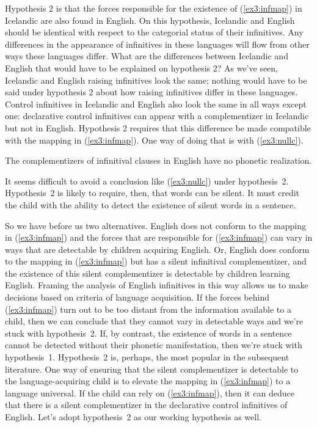 Hypothesis 2 is that the forces responsible for the existence of (\ref{ex3:infmap}) in Icelandic are also found in English. On this hypothesis, Icelandic and English should be identical with respect to the categorial status of their infinitives. Any differences in the appearance of infinitives in these languages will flow from other ways these languages differ. What are the differences between Icelandic and English that would have to be explained on hypothesis 2? As we've seen, Icelandic and English raising infinitives look the same; nothing would have to be said under hypothesis 2 about how raising infinitives differ in these languages. Control infinitives in Icelandic and English also look the same in all ways except one: declarative control infinitives can appear with a complementizer in Icelandic but not in English. Hypothesis 2 requires that this difference be made compatible with the mapping in (\ref{ex3:infmap}). One way of doing that is with (\ref{ex3:nullc}).
\begin{exe}
\ex \label{ex3:nullc} The complementizers of infinitival clauses in English have no phonetic realization.
\end{exe}
It seems difficult to avoid a conclusion like (\ref{ex3:nullc}) under hypothesis~2. Hypothesis~2 is likely to require, then, that words can be silent. It must credit the child with the ability to detect the existence of silent words in a sentence.

So we have before us two alternatives. English does not conform to the mapping in (\ref{ex3:infmap}) and the forces that are responsible for (\ref{ex3:infmap}) can vary in ways that are detectable by children acquiring English. Or, English does conform to the mapping in (\ref{ex3:infmap}) but has a silent infinitival complementizer, and the existence of this silent complementizer is detectable by children learning English. Framing the analysis of English infinitives in this way allows us to make decisions based on criteria of language acquisition. If the forces behind (\ref{ex3:infmap}) turn out to be too distant from the information available to a child, then we can conclude that they cannot vary in detectable ways and we're stuck with hypothesis~2. If, by contrast, the existence of words in a sentence cannot be detected without their phonetic manifestation, then we're stuck with hypothesis~1. Hypothesis~2 is, perhaps, the most popular in the subsequent literature. One way of ensuring that the silent complementizer is detectable to the language-acquiring child is to elevate the mapping in (\ref{ex3:infmap}) to a language universal. If the child can rely on (\ref{ex3:infmap}), then it can deduce that there is a silent complementizer in the declarative control infinitives of English. Let's adopt hypothesis~2 as our working hypothesis as well.

